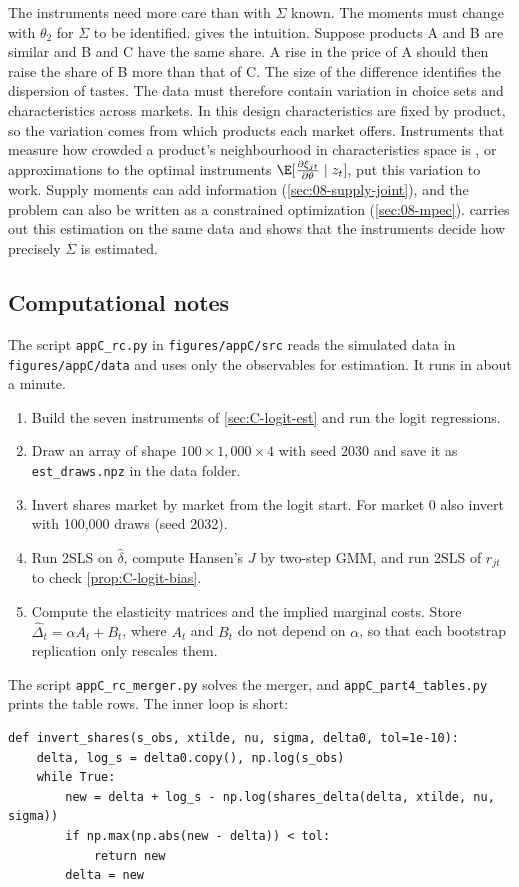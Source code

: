 The instruments need more care than with $\Sigma$ known. The moments must change with $\theta_2$ for $\Sigma$ to be
identified. \citet[p.~529]{Nevo2000a} gives the intuition. Suppose products A and B are similar and B and C have the
same share. A rise in the price of A should then raise the share of B more than that of C. The size of the difference
identifies the dispersion of tastes. The data must therefore contain variation in choice sets and characteristics
across markets. In this design characteristics are fixed by product, so the variation comes from which products each
market offers. Instruments that measure how crowded a product's neighbourhood in characteristics space is
\citep{GandhiHoude2019}, or approximations to the optimal instruments $\E[\frac{\partial\xi_{jt}}{\partial\theta}
\mid z_t]$, put this variation to work. Supply moments can add information (\cref{sec:08-supply-joint}), and the
problem can also be written as a constrained optimization (\cref{sec:08-mpec}).  carries out
this estimation on the same data and shows that the instruments decide how precisely $\Sigma$ is estimated.

\subsection{Computational notes}

The script \texttt{appC\_rc.py} in \texttt{figures/appC/src} reads the simulated data in
\texttt{figures/appC/data} and uses only the observables for estimation. It runs in about a minute.
\begin{enumerate}
  \item Build the seven instruments of \cref{sec:C-logit-est} and run the logit regressions.
  \item Draw an array of shape $100 \times 1{,}000 \times 4$ with seed 2030 and save it as
  \texttt{est\_draws.npz} in the data folder.
  \item Invert shares market by market from the logit start. For market 0 also invert with 100,000 draws (seed 2032).
  \item Run 2SLS on $\hat\delta$, compute Hansen's $J$ by two-step GMM, and run 2SLS of $r_{jt}$ to check
  \cref{prop:C-logit-bias}.
  \item Compute the elasticity matrices and the implied marginal costs. Store $\hat\Delta_t = \alpha A_t + B_t$, where
  $A_t$ and $B_t$ do not depend on $\alpha$, so that each bootstrap replication only rescales them.
\end{enumerate}
The script \texttt{appC\_rc\_merger.py} solves the merger, and \texttt{appC\_part4\_tables.py} prints the table rows.
The inner loop is short:
\begin{verbatim}
def invert_shares(s_obs, xtilde, nu, sigma, delta0, tol=1e-10):
    delta, log_s = delta0.copy(), np.log(s_obs)
    while True:
        new = delta + log_s - np.log(shares_delta(delta, xtilde, nu, sigma))
        if np.max(np.abs(new - delta)) < tol:
            return new
        delta = new
\end{verbatim}

